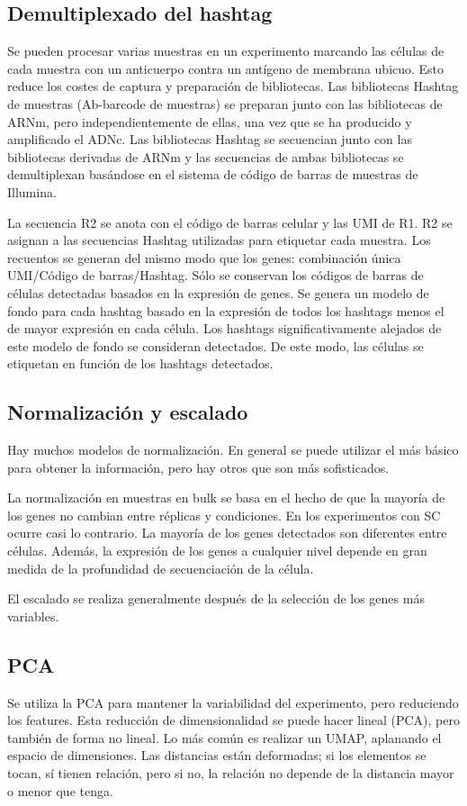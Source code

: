 \subsection{Demultiplexado del hashtag}
Se pueden procesar varias muestras en un experimento marcando las células de cada muestra con un anticuerpo contra un antígeno de membrana ubicuo. Esto reduce los costes de captura y preparación de bibliotecas. Las bibliotecas Hashtag de muestras (Ab-barcode de muestras) se preparan junto con las bibliotecas de ARNm, pero independientemente de ellas, una vez que se ha producido y amplificado el ADNc. Las bibliotecas Hashtag se secuencian junto con las bibliotecas derivadas de ARNm y las secuencias de ambas bibliotecas se demultiplexan basándose en el sistema de código de barras de muestras de Illumina.

La secuencia R2 se anota con el código de barras celular y las UMI de R1. R2 se asignan a las secuencias Hashtag utilizadas para etiquetar cada muestra. Los recuentos se generan del mismo modo que los genes: combinación única UMI/Código de barras/Hashtag. Sólo se conservan los códigos de barras de células detectadas basados en la expresión de genes. Se genera un modelo de fondo para cada hashtag basado en la expresión de todos los hashtags menos el de mayor expresión en cada célula. Los hashtags significativamente alejados de este modelo de fondo se consideran detectados. De este modo, las células se etiquetan en función de los hashtags detectados.

\subsection{Normalización y escalado}
Hay muchos modelos de normalización. En general se puede utilizar el más básico para obtener la información, pero hay otros que son más sofisticados.

La normalización en muestras en bulk se basa en el hecho de que la mayoría de los genes no cambian entre réplicas y condiciones.
En los experimentos con SC ocurre casi lo contrario. La mayoría de los genes detectados son diferentes entre células. Además, la expresión de los genes a cualquier nivel depende en gran medida de la profundidad de secuenciación de la célula.

El escalado se realiza generalmente después de la selección de los genes más variables.

\subsection{PCA}
Se utiliza la PCA para mantener la variabilidad del experimento, pero reduciendo los features. Esta reducción de dimensionalidad se puede hacer lineal (PCA), pero también de forma no lineal. Lo más común es realizar un UMAP, aplanando el espacio de dimensiones. Las distancias están deformadas; si los elementos se tocan, sí tienen relación, pero si no, la relación no depende de la distancia mayor o menor que tenga.

